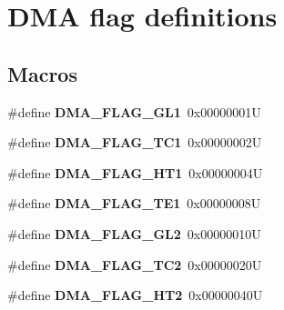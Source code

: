 \hypertarget{group___d_m_a__flag__definitions}{}\section{D\+MA flag definitions}
\label{group___d_m_a__flag__definitions}
\subsection*{Macros}
\begin{DoxyCompactItemize}
\item 
\mbox{\label{group___d_m_a__flag__definitions_ga56f71da03db3e0a5dfad8cdfe46eac5c}} 
\#define {\bfseries D\+M\+A\+\_\+\+F\+L\+A\+G\+\_\+\+G\+L1}~0x00000001U
\item 
\mbox{\label{group___d_m_a__flag__definitions_ga02b6c752c28b35dba79fa1d2bb55ec06}} 
\#define {\bfseries D\+M\+A\+\_\+\+F\+L\+A\+G\+\_\+\+T\+C1}~0x00000002U
\item 
\mbox{\label{group___d_m_a__flag__definitions_ga4317f6260e1aecc4f5fe882fc043f606}} 
\#define {\bfseries D\+M\+A\+\_\+\+F\+L\+A\+G\+\_\+\+H\+T1}~0x00000004U
\item 
\mbox{\label{group___d_m_a__flag__definitions_ga198c0b4984a79514964d3dd5ae546008}} 
\#define {\bfseries D\+M\+A\+\_\+\+F\+L\+A\+G\+\_\+\+T\+E1}~0x00000008U
\item 
\mbox{\label{group___d_m_a__flag__definitions_ga1c8da546d95df14be19e9b82d0a49ecc}} 
\#define {\bfseries D\+M\+A\+\_\+\+F\+L\+A\+G\+\_\+\+G\+L2}~0x00000010U
\item 
\mbox{\label{group___d_m_a__flag__definitions_gacdf2954f3faf8314811ed39272825ab0}} 
\#define {\bfseries D\+M\+A\+\_\+\+F\+L\+A\+G\+\_\+\+T\+C2}~0x00000020U
\item 
\mbox{\label{group___d_m_a__flag__definitions_gab21f437ec8a55a600e5ca2af9416baba}} 
\#define {\bfseries D\+M\+A\+\_\+\+F\+L\+A\+G\+\_\+\+H\+T2}~0x00000040U
\item 

\end{DoxyCompactItemize}
